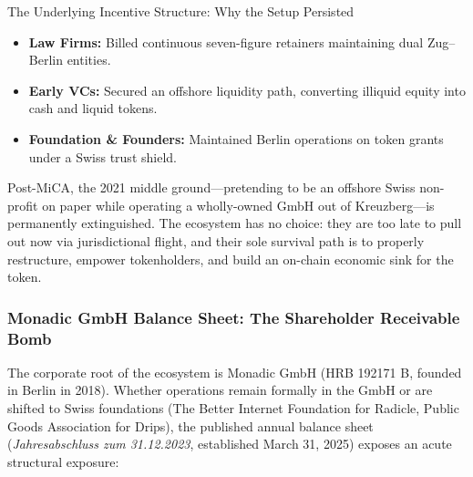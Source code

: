 \documentclass[a4paper,11pt,twoside,parskip=half-,headings=small]{scrartcl}
\begin{document}
\begin{keybox}{The Underlying Incentive Structure: Why the Setup Persisted}
\begin{itemize}[nosep]
  \item \textbf{Law Firms:} Billed continuous seven-figure retainers maintaining dual Zug--Berlin entities.
  \item \textbf{Early VCs:} Secured an offshore liquidity path, converting illiquid equity into cash and liquid tokens.
  \item \textbf{Foundation \& Founders:} Maintained Berlin operations on token grants under a Swiss trust shield.
\end{itemize}
\end{keybox}

Post-MiCA, the 2021 middle ground---pretending to be an offshore Swiss non-profit on paper while operating a wholly-owned GmbH out of Kreuzberg---is permanently extinguished. The ecosystem has no choice: they are too late to pull out now via jurisdictional flight, and their sole survival path is to properly restructure, empower tokenholders, and build an on-chain economic sink for the token.

\clearpage

\subsubsection{Monadic GmbH Balance Sheet: The  Shareholder Receivable Bomb}
\label{sec:monadic_balance_sheet_bomb}

The corporate root of the ecosystem is Monadic GmbH (HRB 192171 B, founded in Berlin in 2018). Whether operations remain formally in the GmbH or are shifted to Swiss foundations (The Better Internet Foundation for Radicle, Public Goods Association for Drips), the published annual balance sheet (\emph{Jahresabschluss zum 31.12.2023}, established March 31, 2025) exposes an acute structural exposure:
\end{document}
